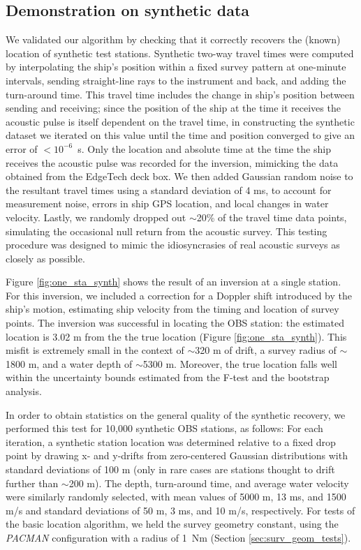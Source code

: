 
\subsection{Demonstration on synthetic data} \label{Demonstration on synthetic data}
We validated our algorithm by checking that it correctly recovers the (known) location of synthetic test stations. Synthetic two-way travel times were computed by interpolating the ship's position within a fixed survey pattern at one-minute intervals, sending straight-line rays to the instrument and back, and adding the turn-around time. This travel time includes the change in ship's position between sending and receiving; since the position of the ship at the time it receives the acoustic pulse is itself dependent on the travel time, in constructing the synthetic dataset we iterated on this value until the time and position converged to give an error of \mbox{$<10^{-6}$ s}. Only the location and absolute time at the time the ship receives the acoustic pulse was recorded for the inversion, mimicking the data obtained from the EdgeTech deck box. We then added Gaussian random noise to the resultant travel times using a standard deviation of 4 ms, to account for measurement noise, errors in ship GPS location, and local changes in water velocity. Lastly, we randomly dropped out $\sim$20\% of the travel time data points, simulating the occasional null return from the acoustic survey. This testing procedure was designed to mimic the idiosyncrasies of real acoustic surveys as closely as possible. 

Figure \ref{fig:one_sta_synth} shows the result of an inversion at a single station. For this inversion, we included a correction for a Doppler shift introduced by the ship's motion, estimating ship velocity from the timing and location of survey points. The inversion was successful in locating the OBS station: the estimated location is 3.02 m from the the true location (Figure \ref{fig:one_sta_synth}). This misfit is extremely small in the context of $\sim$320 m of drift, a survey radius of $\sim$1800 m, and a water depth of $\sim$5300 m. Moreover, the true location falls well within the uncertainty bounds estimated from the F-test and the bootstrap analysis. 

In order to obtain statistics on the general quality of the synthetic recovery, we performed this test for 10,000 synthetic OBS stations, as follows: For each iteration, a synthetic station location was determined relative to a fixed drop point by drawing x- and y-drifts from zero-centered Gaussian distributions with standard deviations of 100 m (only in rare cases are stations thought to drift further than $\sim$200 m). The depth, turn-around time, and average water velocity were similarly randomly selected, with mean values of 5000 m, 13 ms, and 1500 m/s and standard deviations of 50 m, 3 ms, and 10 m/s, respectively.  For tests of the basic location algorithm, we held the survey geometry constant, using the \textit{PACMAN} configuration with a radius of 1~Nm (Section \ref{sec:surv_geom_tests}). 

